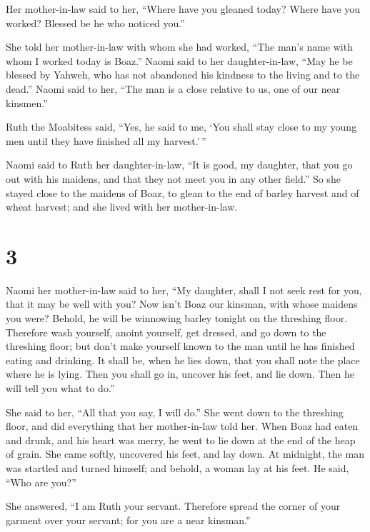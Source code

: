  Her mother-in-law said to her, ``Where have you gleaned
today? Where have you worked? Blessed be he who noticed you.''

She told her mother-in-law with whom she had worked, ``The man's name
with whom I worked today is Boaz.''  Naomi said to her
daughter-in-law, ``May he be blessed by Yahweh, who has not abandoned
his kindness to the living and to the dead.'' Naomi said to her, ``The
man is a close relative to us, one of our near kinsmen.''

 Ruth the Moabitess said, ``Yes, he said to me, `You
shall stay close to my young men until they have finished all my
harvest.'\,''

 Naomi said to Ruth her daughter-in-law, ``It is good, my
daughter, that you go out with his maidens, and that they not meet you
in any other field.''  So she stayed close to the maidens
of Boaz, to glean to the end of barley harvest and of wheat harvest; and
she lived with her mother-in-law.

\hypertarget{section-2}{%
\section{3}\label{section-2}}

 Naomi her mother-in-law said to her, ``My daughter, shall
I not seek rest for you, that it may be well with you? 
Now isn't Boaz our kinsman, with whose maidens you were? Behold, he will
be winnowing barley tonight on the threshing floor. 
Therefore wash yourself, anoint yourself, get dressed, and go down to
the threshing floor; but don't make yourself known to the man until he
has finished eating and drinking.  It shall be, when he
lies down, that you shall note the place where he is lying. Then you
shall go in, uncover his feet, and lie down. Then he will tell you what
to do.''

 She said to her, ``All that you say, I will do.''
 She went down to the threshing floor, and did everything
that her mother-in-law told her.  When Boaz had eaten and
drunk, and his heart was merry, he went to lie down at the end of the
heap of grain. She came softly, uncovered his feet, and lay down.
 At midnight, the man was startled and turned himself; and
behold, a woman lay at his feet.  He said, ``Who are
you?''

She answered, ``I am Ruth your servant. Therefore spread the corner of
your garment over your servant; for you are a near kinsman.''

